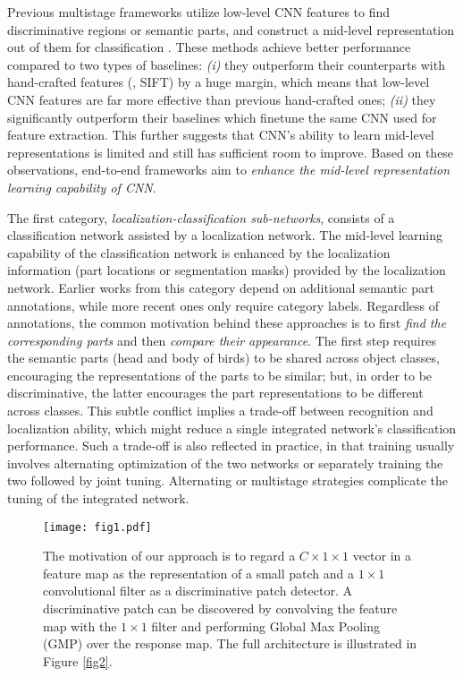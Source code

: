 \documentclass[10pt,twocolumn,letterpaper]{article}
\begin{document}
Previous multistage frameworks utilize low-level CNN features to find discriminative regions or semantic parts,
and construct a mid-level representation out of them for classification \cite{krause15, 2attention, neural_act,
mgd, deepresp, tripmine}. These methods achieve better performance compared to two types of baselines: \textit{(i)}
they outperform their counterparts with hand-crafted features
(\eg, SIFT) by a huge margin, which means that low-level CNN features are far more effective than previous hand-crafted ones;
\textit{(ii)} they significantly outperform their baselines which finetune the same CNN used for feature extraction.
This further suggests that CNN's ability to learn mid-level representations is limited and still has sufficient room to improve.
Based on these observations, end-to-end frameworks aim to \textit{enhance the mid-level representation learning capability of CNN}.

The first category, \textit{localization-classification sub-networks}, consists of a
classification network assisted by a localization network. The mid-level learning capability of the
classification network is enhanced by the localization information (\eg part locations or segmentation masks) provided by 
the localization network. Earlier works from this category \cite{fg_rcnn, deeplac, spda_cnn, partstack, maskcnn} depend
on additional semantic part annotations, while more recent ones \cite{stn, taomei1, taomei2} only require category
labels. Regardless of annotations, the common motivation behind these approaches is to first \textit{find the corresponding parts} and then
\textit{compare their appearance}. The first step requires the semantic
parts (\eg head and body of birds) to be shared across object classes, encouraging
the representations of the parts to be similar; but, in order to be discriminative, the latter encourages the part representations to be
different across classes. This subtle conflict implies a 
trade-off between recognition and localization ability, which might reduce a single integrated network's
classification performance. Such a trade-off is also reflected in practice, in that training usually
involves alternating optimization of the two networks or separately training the two followed by joint tuning.
Alternating or multistage strategies complicate the tuning of the integrated network.
\begin{figure*}[tb]
\begin{center}
\texttt{[image: fig1.pdf]}
\end{center}
\vspace{-9pt}
\caption{\label{fig1}The motivation of our approach is to regard a $C\times1\times1$ vector in a feature map as the representation of a small
patch and a $1\times1$ convolutional filter as a discriminative patch detector. A discriminative patch can be discovered
by convolving the feature map with the $1\times1$ filter and performing Global Max Pooling (GMP) over the response
map. The full architecture is illustrated in Figure \ref{fig2}.}
\end{figure*}
\end{document}
